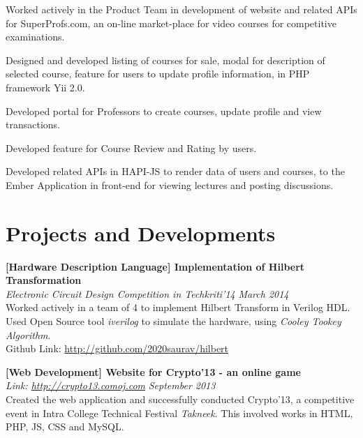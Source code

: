 \documentclass[margin,10pt]{resume}
\begin{document}
\begin{resume}
\begin{list2}
	\begin{list3}
	\vspace{2mm}
	\item Worked actively in the Product Team in development of website and related APIs for SuperProfs.com, an on-line market-place for video courses for competitive examinations.\vspace{2mm}
	\item Designed and developed listing of courses for sale, modal for description of selected course, feature for users to update profile information, in PHP framework Yii 2.0.
	\vspace{2mm}
	\item Developed portal for Professors to create courses, update profile and view transactions.\vspace{2mm}
	\item Developed feature for Course Review and Rating by users.
	\vspace{2mm}
	\item Developed related APIs in HAPI-JS to render data of users and courses, to the Ember Application in front-end for viewing lectures and posting discussions. 
	\end{list3}

\end{list2}
\newpage

\section{\mysidestyle Projects and Developments }

\begin{list2}

\item \textbf{[Hardware Description Language] Implementation of Hilbert Transformation}\\
	\textsl{Electronic Circuit Design Competition in Techkriti'14} \hfill \emph{March 2014}\\
	Worked actively in a team of 4 to implement Hilbert Transform in Verilog HDL. Used Open Source tool \emph{iverilog} to simulate the hardware, using \emph{Cooley Tookey Algorithm}.\\
	Github Link: \url{http://github.com/2020saurav/hilbert}\\ 

\item \textbf{[Web Development] Website for Crypto'13 - an online game} \\
    \textsl{Link: \url{http://crypto13.comoj.com}} \hfill \emph{September 2013}\\
Created the web application and successfully conducted Crypto'13, a competitive event in Intra College Technical Festival \emph{Takneek}. This involved works in HTML, PHP, JS, CSS and MySQL.\\


\end{list2}
\end{resume}
\end{document}
